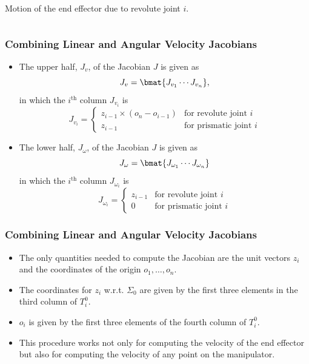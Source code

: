 \begin{frame}
\begin{columns}
\begin{column}{0.4\textwidth}
\begin{figure}[bth]
            \end{figure}
            \vspace{-3mm}
            \centering
            \footnotesize{Motion of the end effector due to revolute joint $i$.}
        \end{column}
    \end{columns}
\end{frame}



\begin{frame}
    \frametitle{Combining Linear and Angular Velocity Jacobians}

    \begin{itemize}
        \item The upper half, $J_v$, of the Jacobian $J$ is given as \[ J_v =
        \bmat{J_{v_1} \cdots J_{v_n}}, \] in which the $i^{\textrm{th}}$ column
        $J_{v_i}$ is \[ J_{v_i} = 
        \begin{cases}
            z_{i-1} \times (o_n - o_{i-1}) & \mbox{for revolute joint $i$} \\
            z_{i-1} & \mbox{for prismatic joint $i$}
        \end{cases}    
        \]
        \item The lower half, $J_\omega$, of the Jacobian $J$ is given as
        \[J_\omega = \bmat{J_{\omega_1} \cdots J_{\omega_n}} \] in which the
        $i^{\textrm{th}}$ column $J_{\omega_i}$ is \[ J_{\omega_i} = 
        \begin{cases}
            z_{i-1} & \mbox{for revolute joint $i$} \\
            0 & \mbox{for prismatic joint $i$}
        \end{cases}
        \]
    \end{itemize}
\end{frame}


\begin{frame}
    \frametitle{Combining Linear and Angular Velocity Jacobians}

    \begin{itemize}
        \item The only quantities needed to compute the Jacobian are the unit 
        vectors $z_i$ and the coordinates of the origin $o_1, \ldots, o_n$.
        \item The coordinates for $z_i$ w.r.t. $\Sigma_0$ are given by the first 
        three elements in the third column of $T_i^0$.
        \item $o_i$ is given by the first three elements of the fourth column of 
        $T_i^0$.
        \item This procedure works not only for computing the velocity of the
        end effector but also for computing the velocity of any point on the
        manipulator.
    \end{itemize}
\end{frame}


